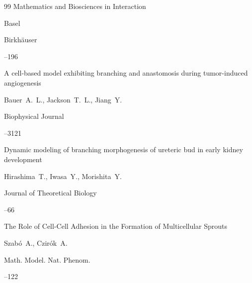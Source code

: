 \begin{thebibliography}{99}
\serial Mathematics and Biosciences in Interaction

\publaddr Basel

\publ Birkh{\"a}user 


--196 


 

 


\paper A cell-based model exhibiting branching and anastomosis during tumor-induced angiogenesis

\by Bauer~A.~L., Jackson~T.~L., Jiang~Y.

\jour Biophysical  Journal




--3121  


 


\paper Dynamic modeling of branching morphogenesis of ureteric bud in early kidney development

\by  Hirashima~T., Iwasa~Y., Morishita~Y.

\jour  Journal of Theoretical Biology




--66


 


\paper The Role of Cell-Cell Adhesion in the Formation of Multicellular Sprouts

\by   Szab\'o~A.,  Czir\'ok~A.

\jour   Math. Model. Nat. Phenom.




--122


 

 



\end{thebibliography}
